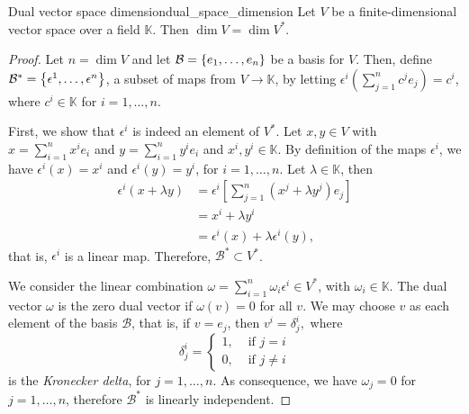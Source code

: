 \begin{theorem}{Dual vector space dimension}{dual_space_dimension}
    Let \(V\) be a finite-dimensional vector space over a field \(\mathbb{K}\). Then \(\dim V = \dim V ^{\ast}\).
\end{theorem}
\begin{proof}
    Let \(n = \dim V\) and let \(\mathcal{B} = \set*{e_1, \dots, e_n}\) be a basis for \(V\). Then, define  \(\mathcal{B}^{\ast} = \set*{\epsilon^1, \dots, \epsilon^n}\), a subset of maps from \(V \to \mathbb{K}\), by letting \(\epsilon^i\left(\sum_{j=1}^{n} c^je_j\right) = c^i\), where \(c^i \in \mathbb{K}\) for \(i = 1, \dots, n\).

    First, we show that \(\epsilon^i\) is indeed an element of \(V ^{\ast}\). Let \(x, y \in V\) with \(x = \sum_{i=1}^n x^i e_i\) and \(y = \sum_{i=1}^n y^i e_i\) and \(x^i,y^i \in \mathbb{K}\). By definition of the maps \(\epsilon^i\), we have \(\epsilon^i(x) = x^i\) and \(\epsilon^i(y) = y^i\), for \(i = 1, \dots, n\). Let \(\lambda \in \mathbb{K}\), then
    \begin{align*}
        \epsilon^i\left(x + \lambda y\right) &= \epsilon^i\left[\sum_{j = 1}^n (x^j + \lambda y^j)e_j\right]\\
                                             &= x^i + \lambda y^i\\
                                             &= \epsilon^i(x) + \lambda \epsilon^i(y),
    \end{align*}
    that is, \(\epsilon^i\) is a linear map. Therefore, \(\mathcal{B}^{\ast} \subset V ^{\ast}\).

    We consider the linear combination \(\omega = \sum_{i = 1}^n \omega_i \epsilon^i \in V ^{\ast}\), with \(\omega_i \in \mathbb{K}\). The dual vector \(\omega\) is the zero dual vector if \(\omega(v) = 0\) for all \(v\). We may choose \(v\) as each element of the basis \(\mathcal{B}\), that is, if \(v = e_j\), then \(v^i = \delta^i_j,\) where
    \begin{equation*}
        \delta_{j}^{i} = \begin{cases}
            1, & \text{ if } j = i\\
            0, & \text{ if } j\neq i
        \end{cases}
    \end{equation*}
    is the \emph{Kronecker delta}, for \(j = 1, \dots, n\). As consequence, we have \(\omega_j = 0\) for \(j = 1, \dots, n\), therefore \(\mathcal{B}^{\ast}\) is linearly independent.


\end{proof}
